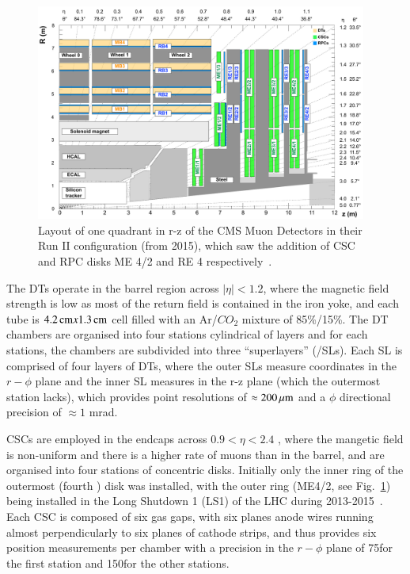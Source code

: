 \begin{figure}[htbp]
\begin{center}
\includegraphics[width=0.97\textwidth]{figs/cms/cms_muon_quadrant_run_ii.pdf}
\caption{Layout of one quadrant in r-z of the CMS Muon Detectors in their Run II configuration (from 2015), which saw the addition of CSC and RPC disks ME 4/2 and RE 4 respectively~\cite{CMS-DP-2016-046}.}
\label{fig:muonChambers}
\end{center}
\end{figure}

The DTs operate in the barrel region across $|\eta| < 1.2$, where the magnetic field strength is low as most of the return field is contained in the iron yoke,	and each tube is $4.2\,\text{cm} x 1.3\,\text{cm}$ cell filled with an Ar/$CO_{2}$ mixture of 85\%/15\%.
The DT chambers are organised into four stations cylindrical of layers and for each stations, the chambers are subdivided into three ``superlayers'' (/SLs).
Each SL is comprised of four layers of DTs, where the outer SLs measure coordinates in the $r-\phi$ plane and the inner SL measures in the r-z plane (which the outermost station lacks), which provides point resolutions of $\approx 200\,\mu\text{m}$ and a $\phi$ directional precision of $\approx 1$ mrad.

CSCs are employed in the endcaps across $0.9 < \eta < 2.4$ , where the mangetic field is non-uniform and there is a higher rate of muons than in the barrel, and are organised into four stations of concentric disks.
Initially only the inner ring of the outermost (fourth ) disk was installed, with the outer ring (ME4/2, see Fig.~\ref{fig:muonChambers}) being installed in the Long Shutdown 1 (LS1) of the LHC during 2013-2015~\cite{Battilana:2017mrm}.
Each CSC is composed of six gas gaps, with six planes anode wires running almost perpendicularly to six planes of cathode strips, and thus provides six position measurements per chamber with a precision in the $r-\phi$ plane of 75\mum for the first station and 150\mum for the other stations\cite{CMS:1997iti}.

